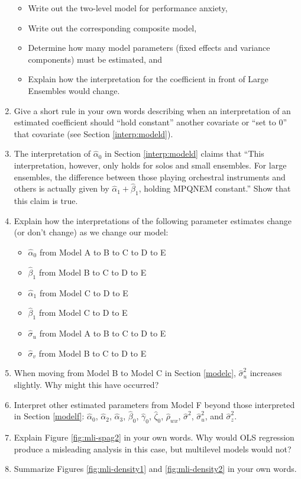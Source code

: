 \documentclass[
]{krantz}
\providecommand{\tightlist}{%
  \setlength{\itemsep}{0pt}\setlength{\parskip}{0pt}}
\begin{document}
\begin{enumerate}
  \begin{itemize}
  \tightlist
  \item
    Write out the two-level model for performance anxiety,
  \item
    Write out the corresponding composite model,
  \item
    Determine how many model parameters (fixed effects and variance components) must be estimated, and
  \item
    Explain how the interpretation for the coefficient in front of Large Ensembles would change.
  \end{itemize}
\item
  Give a short rule in your own words describing when an interpretation of an estimated coefficient should ``hold constant'' another covariate or ``set to 0'' that covariate (see Section \ref{interp:modeld}).
\item
  The interpretation of \(\hat{\alpha}_{0}\) in Section \ref{interp:modeld} claims that ``This interpretation, however, only holds for solos and small ensembles. For large ensembles, the difference between those playing orchestral instruments and others is actually given by \(\hat{\alpha}_{1}+\hat{\beta}_{1}\), holding MPQNEM constant.'' Show that this claim is true.
\item
  Explain how the interpretations of the following parameter estimates change (or don't change) as we change our model:

  \begin{itemize}
  \tightlist
  \item
    \(\hat{\alpha}_{0}\) from Model A to B to C to D to E
  \item
    \(\hat{\beta}_{1}\) from Model B to C to D to E
  \item
    \(\hat{\alpha}_{1}\) from Model C to D to E
  \item
    \(\hat{\beta}_{1}\) from Model C to D to E
  \item
    \(\hat{\sigma}_{u}\) from Model A to B to C to D to E
  \item
    \(\hat{\sigma}_{v}\) from Model B to C to D to E
  \end{itemize}
\item
  When moving from Model B to Model C in Section \ref{modelc}, \(\hat{\sigma}_{u}^{2}\) increases slightly. Why might this have occurred?
\item
  Interpret other estimated parameters from Model F beyond those interpreted in Section \ref{modelf}: \(\hat{\alpha}_{0}\), \(\hat{\alpha}_{2}\), \(\hat{\alpha}_{3}\), \(\hat{\beta}_{0}\), \(\hat{\gamma}_{0}\), \(\hat{\zeta}_{0}\), \(\hat{\rho}_{wx}\), \(\hat{\sigma}^{2}\), \(\hat{\sigma}_{u}^{2}\), and \(\hat{\sigma}_{z}^{2}\).
\item
  Explain Figure \ref{fig:mli-spag2} in your own words. Why would OLS regression produce a misleading analysis in this case, but multilevel models would not?
\item
  Summarize Figures \ref{fig:mli-density1} and \ref{fig:mli-density2} in your own words.
\end{enumerate}
\end{document}
